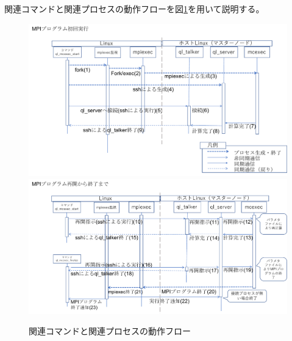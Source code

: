\documentclass[twoside,11pt,fleqn]{book}
\begin{document}
関連コマンドと関連プロセスの動作フローを図\ref{fig:SequenceDiagram}を用いて説明する。
%
\begin{figure}[!t]
\centering
\includegraphics[width=0.90\linewidth]{figs/SequenceDiagram1.pdf}
\includegraphics[width=0.90\linewidth]{figs/SequenceDiagram2.pdf}
\vspace{-0em}\caption{関連コマンドと関連プロセスの動作フロー}
\label{fig:SequenceDiagram}
\vspace{-0em}
\end{figure}
\FloatBarrier
%
\end{document}
